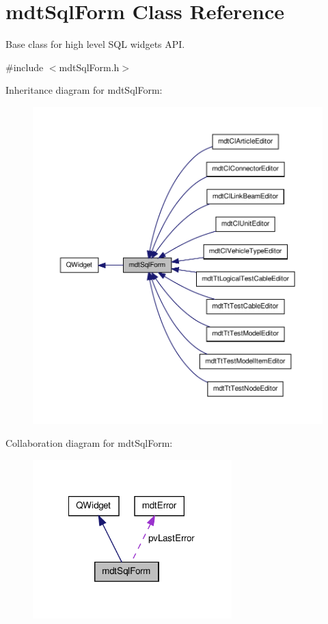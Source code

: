 \hypertarget{classmdt_sql_form}{\section{mdt\-Sql\-Form Class Reference}
\label{classmdt_sql_form}
}


Base class for high level S\-Q\-L widgets A\-P\-I.  




{\ttfamily \#include $<$mdt\-Sql\-Form.\-h$>$}



Inheritance diagram for mdt\-Sql\-Form\-:
\nopagebreak
\begin{figure}[H]
\begin{center}
\leavevmode
\includegraphics[width=350pt]{classmdt_sql_form__inherit__graph}
\end{center}
\end{figure}


Collaboration diagram for mdt\-Sql\-Form\-:\nopagebreak
\begin{figure}[H]
\begin{center}
\leavevmode
\includegraphics[width=218pt]{classmdt_sql_form__coll__graph}
\end{center}
\end{figure}
